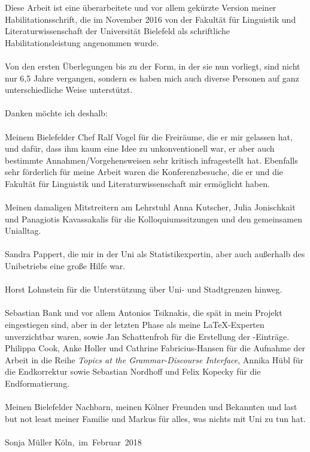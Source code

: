 \begin{refsection}

Diese Arbeit ist eine überarbeitete und vor allem gekürzte Version meiner Habilitationsschrift, die im November 2016 von der Fakultät für Linguistik und Literaturwissenschaft der Universität Bielefeld als schriftliche Habilitationsleistung angenommen wurde.\\
\noindent
\\ Von den ersten Überlegungen bis zu der Form, in der sie nun vorliegt, sind nicht nur 6,5 Jahre vergangen, sondern es haben mich auch diverse Personen auf ganz unterschiedliche Weise unterstützt.\\
\noindent
\\ Danken möchte ich deshalb:\\
\noindent
\\ Meinem Bielefelder Chef Ralf Vogel für die Freiräume, die er mir gelassen hat, und dafür, dass ihm kaum eine Idee zu unkonventionell war, er aber auch bestimmte Annahmen/Vorgehensweisen sehr kritisch infragestellt hat. Ebenfalls sehr förderlich für meine Arbeit waren die Konferenzbesuche, die er und die Fakultät für Linguistik und Literaturwissenschaft mir ermöglicht haben.\\
\noindent
\\ Meinen damaligen Mitstreitern am Lehrstuhl Anna Kutscher, Julia Jonischkait und Panagiotis Kavassakalis für die Kolloquiumssitzungen und den gemeinsamen Unialltag.\\
\noindent
\\ Sandra Pappert, die mir in der Uni als Statistikexpertin, aber auch außerhalb des Unibetriebs eine große Hilfe war.\\
\noindent
\\ Horst Lohnstein für die Unterstützung über Uni- und Stadtgrenzen hinweg.\\
\noindent
\\ Sebastian Bank und vor allem Antonios Tsiknakis, die spät in mein Projekt eingestiegen sind, aber in der letzten Phase als meine \LaTeX-Experten unverzichtbar waren, sowie Jan Schattenfroh für die Erstellung der \BibTeX-Einträge.
\pagebreak
\noindent
\\Philippa Cook, Anke Holler und Cathrine Fabricius-Hansen für die Aufnahme der Arbeit in die Reihe \textit{Topics at the Grammar-Discourse Interface}, Annika Hübl für die Endkorrektur sowie Sebastian Nordhoff und Felix Kopecky für die Endformatierung.\\
\noindent
\\ Meinen Bielefelder Nachbarn, meinen Kölner Freunden und Bekannten und last but not least meiner Familie und Markus für alles, was nichts mit Uni zu tun hat.\\\\
\noindent
Sonja Müller
\hfill\hbox{Köln, im Februar 2018}





\printbibliography[heading=subbibliography]
\end{refsection}

